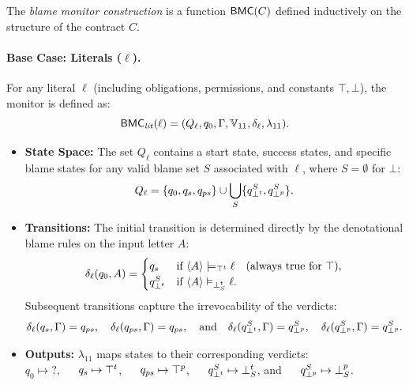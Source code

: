\begin{definition}
\label{def:bmc}
The \emph{blame monitor construction} is a function $\mathsf{BMC}(C)$ defined inductively on the structure of the contract $C$.

\paragraph{Base Case: Literals ($\ell$).}
For any literal $\ell$ (including obligations, permissions, and constants $\top, \bot$), the monitor is defined as:
\[
\mathsf{BMC}_{\mathit{lit}}(\ell) = (Q_{\ell}, q_0, \Gamma, \mathbb{V}_{11}, \delta_{\ell}, \lambda_{11}).
\]
\begin{itemize}
    \item \textbf{State Space:} The set $Q_{\ell}$ contains a start state, success states, and specific blame states for any valid blame set $S$ associated with $\ell$, where $S=\emptyset$ for $\bot$:
    \[
    Q_{\ell} = \{q_0, q_s, q_{ps}\} \cup \bigcup_{S} \{q_{\bot^t}^S, q_{\bot^p}^S\}.
    \]
    \item \textbf{Transitions:} The initial transition is determined directly by the denotational blame rules on the input letter $A$:
    \[
    \delta_{\ell}(q_0, A) = 
    \begin{cases}
        q_s & \text{if } \langle A \rangle  \models_{\top^t} \ell \quad (\text{always true for } \top), \\
        q_{\bot^t}^S & \text{if } \langle A \rangle  \vDash_{\mathbin{\bot^{t}_{S}}} \ell.
    \end{cases}
    \]
    Subsequent transitions capture the irrevocability of the verdicts:
    \[
    \delta_{\ell}(q_s, \Gamma) = q_{ps}, \quad \delta_{\ell}(q_{ps}, \Gamma) = q_{ps}, \quad \text{and} \quad
    \delta_{\ell}(q_{\bot^t}^S, \Gamma) = q_{\bot^p}^S, \quad \delta_{\ell}(q_{\bot^p}^S, \Gamma) = q_{\bot^p}^S.
    \]
    \item \textbf{Outputs:} $\lambda_{11}$ maps states to their corresponding verdicts:\\
    $q_0 \mapsto \mathsf{?}$, ~~
    $q_s \mapsto \top^t$, ~~
    $q_{ps} \mapsto \top^p$, ~~
    $q_{\bot^t}^S \mapsto \mathbin{\bot^{t}_{S}}$, and ~~
    $q_{\bot^p}^S \mapsto \mathbin{\bot^{p}_{S}}$.
\end{itemize}


\end{definition}

